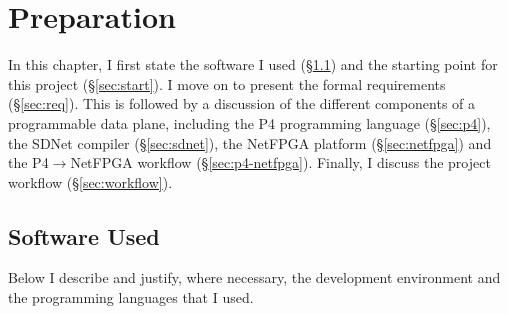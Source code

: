 \chapter{Preparation}
In this chapter, I first state the software I used (\S\ref{sec:used}) and the starting point for this project (\S\ref{sec:start}). I move on to present the formal requirements (\S\ref{sec:req}). This is followed by a discussion of the different components of a programmable data plane, including the P4 programming language (\S\ref{sec:p4}), the SDNet compiler (\S\ref{sec:sdnet}), the NetFPGA platform (\S\ref{sec:netfpga}) and the P4$\rightarrow$NetFPGA workflow (\S\ref{sec:p4-netfpga}). Finally, I discuss the project workflow (\S\ref{sec:workflow}).

\section{Software Used}
\label{sec:used}
Below I describe and justify, where necessary, the development environment and the programming languages that I used.

